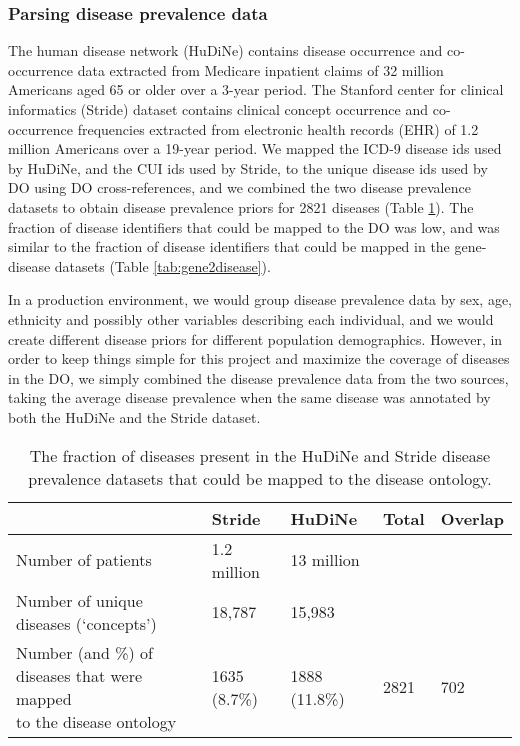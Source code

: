 \documentclass[11pt]{article}
\begin{document}
\subsubsection{Parsing disease prevalence data}

The human disease network (HuDiNe) \cite{Hidalgo2009} contains disease occurrence and co-occurrence data extracted from Medicare inpatient claims of 32 million Americans aged 65 or older over a 3-year period. The Stanford center for clinical informatics (Stride) \cite{Finlayson2014} dataset contains clinical concept occurrence and co-occurrence frequencies extracted from electronic health records (EHR) of 1.2 million Americans over a 19-year period. We mapped the ICD-9 disease ids used by HuDiNe, and the CUI ids used by Stride, to the unique disease ids used by DO using DO cross-references, and we combined the two disease prevalence datasets to obtain disease prevalence priors for 2821 diseases (Table \ref{tab:emr2disease}).  The fraction of disease identifiers that could be mapped to the DO was low, and was similar to the fraction of disease identifiers that could be mapped in the gene-disease datasets (Table \ref{tab:gene2disease}). 

In a production environment, we would group disease prevalence data by sex, age, ethnicity and possibly other variables describing each individual, and we would create different disease priors for different population demographics. However, in order to keep things simple for this project and maximize the coverage of diseases in the DO, we simply combined the disease prevalence data from the two sources, taking the average disease prevalence when the same disease was annotated by both the HuDiNe and the Stride dataset.


\begin{table} %
\caption{The fraction of diseases present in the HuDiNe and Stride disease prevalence datasets that could be mapped to the disease ontology.}
\label{tab:emr2disease}
\centering
\begin{tabular}{l|llll} \toprule
& Stride & HuDiNe & Total & Overlap \\ \midrule
Number of patients & 1.2 million & 13 million & & \\
Number of unique diseases (‘concepts’) & 18,787 & 15,983 & & \\
\pbox{20cm}{Number (and \%) of diseases that were mapped\\
to the disease ontology}
& 1635 (8.7\%) & 1888 (11.8\%) & 2821 & 702 \\
\bottomrule
\end{tabular}
\end{table}
\end{document}
